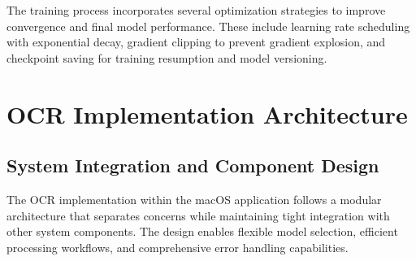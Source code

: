 The training process incorporates several optimization strategies to improve convergence and final model performance. These include learning rate scheduling with exponential decay, gradient clipping to prevent gradient explosion, and checkpoint saving for training resumption and model versioning.

\section{OCR Implementation Architecture}

\subsection{System Integration and Component Design}

The OCR implementation within the macOS application follows a modular architecture that separates concerns while maintaining tight integration with other system components. The design enables flexible model selection, efficient processing workflows, and comprehensive error handling capabilities.


